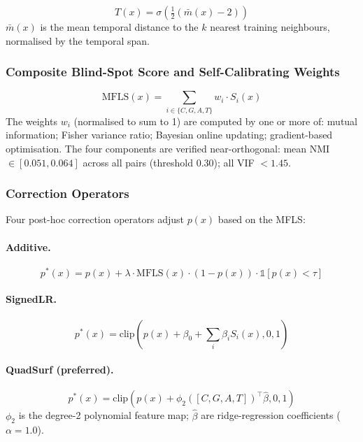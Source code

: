 \documentclass[12pt,a4paper]{article}
\begin{document}
\begin{equation}
T(x) = \sigma\!\left(\tfrac{1}{2}(\bar{m}(x)-2)\right)
\end{equation}
$\bar{m}(x)$ is the mean temporal distance to the $k$ nearest training
neighbours, normalised by the temporal span.

\subsubsection{Composite Blind-Spot Score and Self-Calibrating Weights}

\begin{equation}
\mathrm{MFLS}(x) = \sum_{i\in\{C,G,A,T\}} w_i\cdot S_i(x)
\end{equation}
The weights $w_i$ (normalised to sum to 1) are computed by one or more
of: mutual information; Fisher variance ratio; Bayesian online updating;
gradient-based optimisation. The four components are verified
near-orthogonal: mean NMI $\in[0.051,0.064]$ across all pairs (threshold
0.30); all VIF $<1.45$.

\subsubsection{Correction Operators}

Four post-hoc correction operators adjust $p(x)$ based on the MFLS:

\paragraph{Additive.}
\begin{equation}
p^*(x) = p(x) + \lambda\cdot\mathrm{MFLS}(x)\cdot(1-p(x))
\cdot\mathbb{1}[p(x)<\tau]
\end{equation}

\paragraph{SignedLR.}
\begin{equation}
p^*(x) = \mathrm{clip}\!\left(p(x)+\beta_0+\textstyle\sum_i\beta_i S_i(x),0,1\right)
\end{equation}

\paragraph{QuadSurf (preferred).}
\begin{equation}
p^*(x) = \mathrm{clip}\!\left(p(x)+\phi_2([C,G,A,T])^\top\hat{\beta},0,1\right)
\end{equation}
$\phi_2$ is the degree-2 polynomial feature map;
$\hat{\beta}$ are ridge-regression coefficients ($\alpha{=}1.0$).
\end{document}
